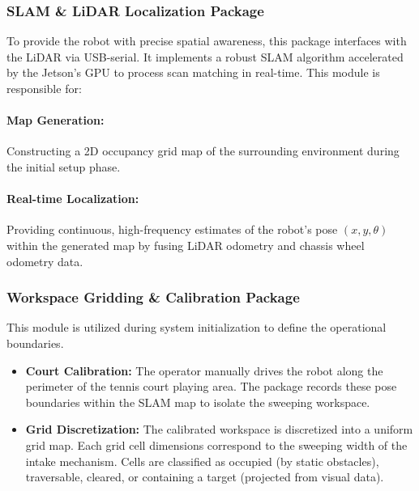 \subsubsection{SLAM \& LiDAR Localization Package}
\label{sec:slam}
To provide the robot with precise spatial awareness, this package interfaces with the LiDAR via USB-serial. It implements a robust SLAM algorithm accelerated by the Jetson's GPU to process scan matching in real-time. This module is responsible for:

\paragraph*{Map Generation:} Constructing a 2D occupancy grid map of the surrounding environment during the initial setup phase.

\paragraph*{Real-time Localization:} Providing continuous, high-frequency estimates of the robot's pose $(x, y, \theta)$ within the generated map by fusing LiDAR odometry and chassis wheel odometry data.

\subsubsection{Workspace Gridding \& Calibration Package}
\label{sec:gridding}
This module is utilized during system initialization to define the operational boundaries.
\begin{itemize}
  \item \textbf{Court Calibration:} The operator manually drives the robot along the perimeter of the tennis court playing area. The package records these pose boundaries within the SLAM map to isolate the sweeping workspace.
  \item \textbf{Grid Discretization:} The calibrated workspace is discretized into a uniform grid map. Each grid cell dimensions correspond to the sweeping width of the intake mechanism. Cells are classified as occupied (by static obstacles), traversable, cleared, or containing a target (projected from visual data).
\end{itemize}

